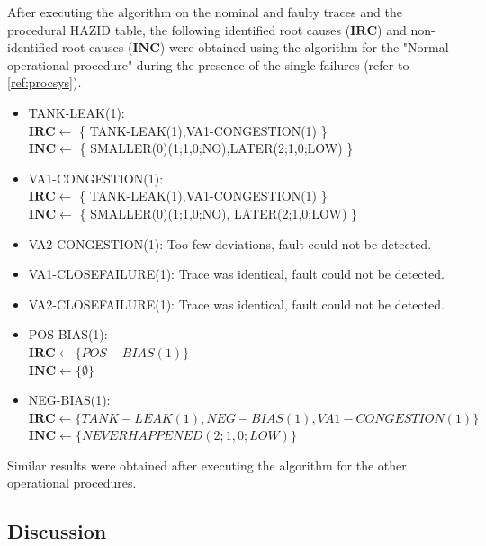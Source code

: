 \documentclass[conference]{IEEEtran}
\begin{document}
After executing the algorithm on the nominal and faulty traces and the procedural HAZID table, the following identified root causes ($\mathbf{IRC}$) and non-identified root causes ($\mathbf{INC}$) were obtained using the algorithm for the "Normal operational procedure" during the presence of the single failures (refer to \ref{ref:procsys}).

\begin{itemize}

\item TANK-LEAK(1): \\ $\mathbf{IRC} \leftarrow$ \{ TANK-LEAK(1),VA1-CONGESTION(1) \} \\ $\mathbf{INC} \leftarrow$ \{ SMALLER(0)(1;1,0;NO),LATER(2;1,0;LOW) \}

\item VA1-CONGESTION(1): \\ $\mathbf{IRC} \leftarrow $ \{ TANK-LEAK(1),VA1-CONGESTION(1) \}\\ $\mathbf{INC} \leftarrow$ \{ SMALLER(0)(1;1,0;NO), LATER(2;1,0;LOW) \}

\item VA2-CONGESTION(1): Too few deviations, fault could not be detected.

\item VA1-CLOSEFAILURE(1): Trace was identical, fault could not be detected.

\item VA2-CLOSEFAILURE(1): Trace was identical, fault could not be detected.

\item POS-BIAS(1): \\ $\mathbf{IRC} \leftarrow \{ POS-BIAS(1) \}$ \\ $\mathbf{INC} \leftarrow \{ \emptyset \} $

\item NEG-BIAS(1): \\ $\mathbf{IRC} \leftarrow \{ TANK-LEAK(1), NEG-BIAS(1), VA1-CONGESTION(1) \}$ \\ $\mathbf{INC} \leftarrow \{ NEVERHAPPENED(2;1,0;LOW) \}$

\end{itemize}

Similar results were obtained after executing the algorithm for the other operational procedures.

\subsection{Discussion}
\end{document}

